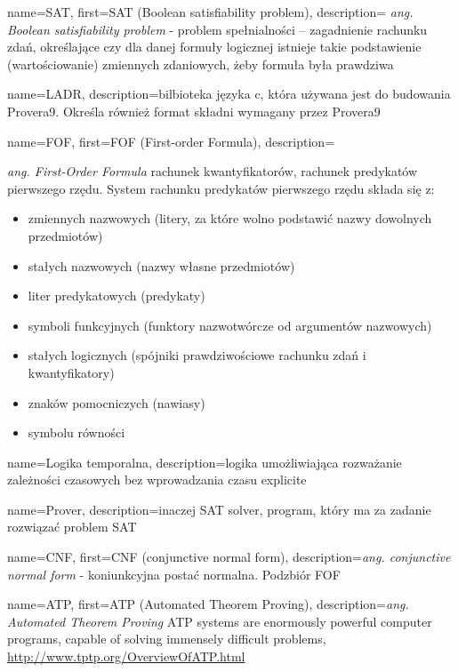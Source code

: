 
 {
    name=SAT,
    first={SAT (Boolean satisfiability problem)},
    description={ \textit{ang. Boolean satisfiability problem} - problem spełnialności – zagadnienie rachunku zdań, określające czy dla danej formuły logicznej istnieje takie podstawienie (wartościowanie) zmiennych zdaniowych, żeby formuła była prawdziwa}
}

 {
    name=LADR,
    description={bilbioteka języka c, która używana jest do budowania Provera9. Określa również format składni wymagany przez Provera9}
}

 {
    name=FOF,
    first={FOF (First-order Formula)},
    description={\textit{ang. First-Order Formula} rachunek kwantyfikatorów, rachunek predykatów pierwszego rzędu. System rachunku predykatów pierwszego rzędu składa się z:
\begin{itemize}
    \item zmiennych nazwowych (litery, za które wolno podstawić nazwy dowolnych przedmiotów)
    \item stałych nazwowych (nazwy własne przedmiotów)
    \item liter predykatowych (predykaty)
    \item symboli funkcyjnych (funktory nazwotwórcze od argumentów nazwowych)
    \item stałych logicznych (spójniki prawdziwościowe rachunku zdań i kwantyfikatory)
    \item znaków pomocniczych (nawiasy)
    \item symbolu równości
\end{itemize}
    }
}

 {
    name={Logika temporalna},
    description={logika umożliwiająca rozważanie zależności czasowych bez wprowadzania czasu explicite}
}

 {
    name=Prover,
    description={inaczej SAT solver, program, który ma za zadanie rozwiązać problem SAT}
}

 {
    name=CNF,
    first={CNF (conjunctive normal form)},
    description={\textit{ang. conjunctive normal form} - koniunkcyjna postać normalna. Podzbiór FOF}
}

 {
    name=ATP,
    first={ATP (Automated Theorem Proving)},
    description={\textit{ang. Automated Theorem Proving} ATP systems are enormously powerful computer programs, capable of solving immensely difficult problems, \url{http://www.tptp.org/OverviewOfATP.html}}
}

